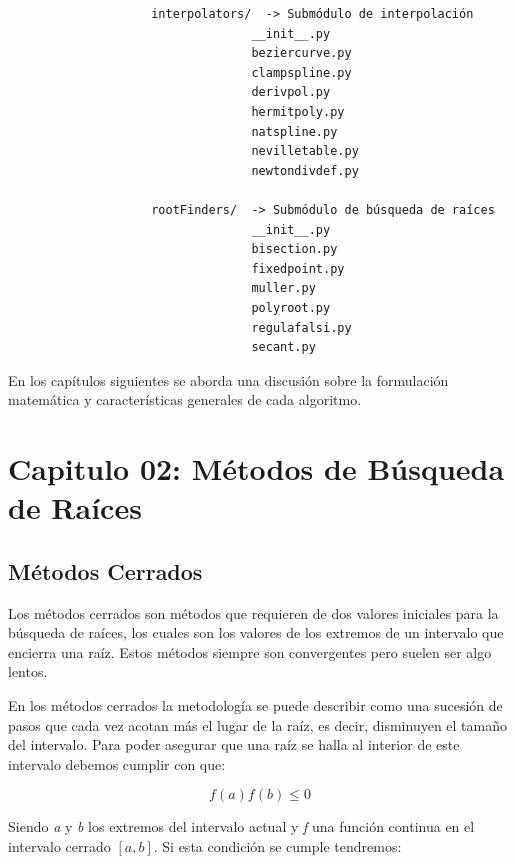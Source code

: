 \documentclass[letterpaper,10pt,oneside]{sphinxmanual}
\theoremstyle{plain}%
\theoremstyle{definition}%
\theoremstyle{remark}%
\begin{document}
\begin{verbatim}
                    interpolators/  -> Submódulo de interpolación
                                  __init__.py
                                  beziercurve.py
                                  clampspline.py
                                  derivpol.py
                                  hermitpoly.py
                                  natspline.py
                                  nevilletable.py
                                  newtondivdef.py
                                  
                    rootFinders/  -> Submódulo de búsqueda de raíces
                                  __init__.py
                                  bisection.py
                                  fixedpoint.py
                                  muller.py
                                  polyroot.py
                                  regulafalsi.py
                                  secant.py
\end{verbatim}

En los capítulos siguientes se aborda una discusión sobre la formulación matemática y características generales de cada algoritmo.

\chapter{Capitulo 02: Métodos de Búsqueda de Raíces}
\label{chapter02::doc}\label{chapter02:capitulo-02-Búsqueda de Raíces}

\section{Métodos Cerrados}
\label{chapter02:Métodos Cerrados}

\noindent Los métodos cerrados son métodos que requieren de dos valores iniciales para la búsqueda de
raíces, los cuales son los valores de los extremos de un intervalo que encierra una raíz. Estos
métodos siempre son convergentes pero suelen ser algo lentos.\medskip

\noindent En los métodos cerrados la metodología se puede describir como una sucesión de pasos que
cada vez acotan más el lugar de la raíz, es decir, disminuyen el tamaño del intervalo. Para
poder asegurar que una raíz se halla al interior de este intervalo debemos cumplir con que:\medskip

\begin{equation}
 f(a)f(b)\leq 0 \label{Bolz}
\end{equation}

\noindent Siendo \textit{a} y \textit{b} los extremos del intervalo actual y \textit{f} una función continua en el intervalo cerrado $\left[a,b\right]$. Si esta condición se cumple tendremos:\medskip
\end{document}
